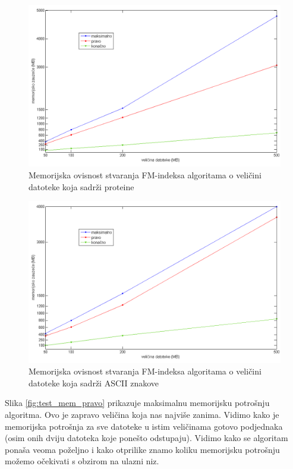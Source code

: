 \begin{figure}[H]
   \centering
       \includegraphics[width=\textwidth]{./pictures/test_mem_proteini.png}
 \caption{Memorijska ovisnost stvaranja FM-indeksa algoritama o veličini datoteke koja sadrži proteine}
 \label{fig:test_mem_proteini}
\end{figure}

\begin{figure}[H]
   \centering
       \includegraphics[width=\textwidth]{./pictures/test_mem_ascii.png}
 \caption{Memorijska ovisnost stvaranja FM-indeksa algoritama o veličini datoteke koja sadrži ASCII znakove}
 \label{fig:test_mem_ascii}
\end{figure}

Slika  \ref{fig:test_mem_pravo} prikazuje maksimalnu memorijsku potrošnju algoritma. Ovo je zapravo veličina koja nas najviše zanima. Vidimo kako je memorijska potrošnja za sve datoteke u istim veličinama gotovo podjednaka (osim onih dviju datoteka koje ponešto odstupaju). Vidimo kako se algoritam ponaša veoma poželjno i kako otprilike znamo koliku memorijsku potrošnju možemo očekivati s obzirom na ulazni niz.

